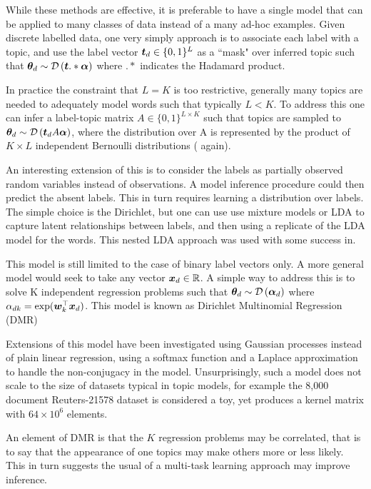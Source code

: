 While these methods are effective, it is preferable to have a single model that can be applied to many classes of data instead of a many ad-hoc examples. Given discrete labelled data, one very simply approach is to associate each label with a topic, and use the label vector $\bm t_d \in \{0,1\}^L$ as a ``mask" over inferred topic such that ${ \bm \theta_d } \sim \mathcal{D} \left( {\bm t .* \bm \alpha} \right)$\cite{Ramage2009} where $.*$ indicates the Hadamard product.

In practice the constraint that $L = K$ is too restrictive, generally many topics are needed to adequately model words such that typically $L < K$. To address this one can infer a label-topic matrix $A \in \{0,1\}^{L \times K}$ such that topics are sampled to ${ \bm \theta_d } \sim \mathcal{D} \left( {\bm t_d A \bm \alpha} \right)$, where the distribution over A is represented by the product of $K \times L$ independent Bernoulli distributions (\cite{Ramage2009} again).

An interesting extension of this is to consider the labels as partially observed random variables instead of observations. A model inference procedure could then predict the absent labels. This in turn requires learning a distribution over labels. The simple choice is the Dirichlet, but one can use use mixture models or LDA to capture latent relationships between labels, and then using a replicate of the LDA model for the words. This nested LDA approach was used with some success in\cite{Rubin2011}. 

This model is still limited to the case of binary label vectors only. A more general model would seek to take any vector ${ \bm x_d } \in \mathbb{R}$. A simple way to address this is to solve K independent regression problems such that ${ \bm \theta_d } \sim \mathcal{D} \left( {\bm \alpha_{d}} \right)$ where $\alpha_{dk} = \exp(\bm w_k^\top\bm x_d)$\cite{Mimno2008}. This model is known as Dirichlet Multinomial Regression (DMR)

Extensions of this model have been investigated using Gaussian processes instead of plain linear regression, using a softmax function\cite{Hennig2012} and a Laplace approximation\cite{WilliamsBarber1998} to handle the non-conjugacy in the model. Unsurprisingly, such a model does not scale to the size of datasets typical in topic models, for example the 8,000 document Reuters-21578 dataset is considered a toy, yet produces a kernel matrix with $64 \times 10^6$ elements.

An element of DMR is that the $K$ regression problems may be correlated, that is to say that the appearance of one topics may make others more or less likely. This in turn suggests the usual of a multi-task learning approach may improve inference.

